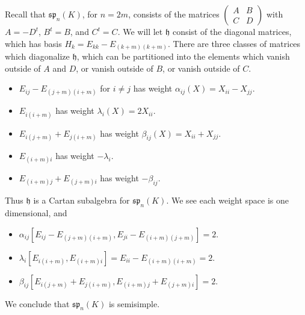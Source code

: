 \begin{example}
    Recall that $\mathfrak{sp}_n(K)$, for $n = 2m$, consists of the matrices $\left( \begin{smallmatrix} A & B \\ C & D \end{smallmatrix} \right)$ with $A = -D^t$, $B^t = B$, and $C^t = C$. We will let $\mathfrak{h}$ consist of the diagonal matrices, which has basis $H_k = E_{kk} - E_{(k + m)(k+m)}$. There are three classes of matrices which diagonalize $\mathfrak{h}$, which can be partitioned into the elements which vanish outside of $A$ and $D$, or vanish outside of $B$, or vanish outside of $C$.
    \begin{itemize}
        \item $E_{ij} - E_{(j+m)(i+m)}$ for $i \neq j$ has weight $\alpha_{ij}(X) = X_{ii} - X_{jj}$.

        \item $E_{i(i+m)}$ has weight $\lambda_i(X) = 2 X_{ii}$.
        
        \item $E_{i(j+m)} + E_{j(i+m)}$ has weight $\beta_{ij}(X) = X_{ii} + X_{jj}$.

        \item $E_{(i+m)i}$ has weight $-\lambda_i$.

        \item $E_{(i+m)j} + E_{(j+m)i}$ has weight $-\beta_{ij}$.
    \end{itemize}
    Thus $\mathfrak{h}$ is a Cartan subalgebra for $\mathfrak{sp}_n(K)$. We see each weight space is one dimensional, and
    \begin{itemize}
        \item $\alpha_{ij} [E_{ij} - E_{(j+m)(i+m)}, E_{ji} - E_{(i+m)(j+m)}] = 2$.
        \item $\lambda_i [E_{i(i+m)}, E_{(i+m)i}] = E_{ii} - E_{(i+m)(i+m)} = 2$.
        \item $\beta_{ij}[E_{i(j+m)} + E_{j(i+m)}, E_{(i+m)j} + E_{(j+m)i}] = 2$.
    \end{itemize}
    We conclude that $\mathfrak{sp}_n(K)$ is semisimple.
\end{example}

